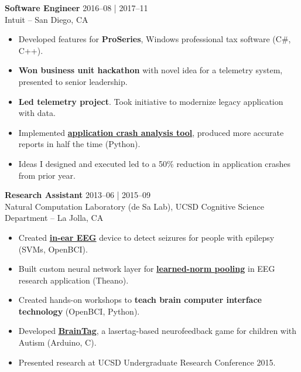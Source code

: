 \documentclass[line,mm]{res}
\begin{document}
{\bf Software Engineer} \hfill 2016--08 | 2017--11 \\
  Intuit -- San Diego, CA
  \begin{itemize}  \itemsep -2pt %
    \item Developed features for {\bf ProSeries}, Windows professional tax software (C\#, C++).
    \item {\bf Won business unit hackathon} with novel idea for a telemetry system, presented to senior leadership.
    \item {\bf Led telemetry project}. Took initiative to modernize legacy application with data.
    \item Implemented \href{https://github.com/alxrsngrtn/CrashAnalysisTool}{{\bf application crash analysis tool}}, produced more accurate reports in half the time (Python).
    \item Ideas I designed and executed led to a 50\% reduction in application crashes from prior year. 
  \end{itemize} 

	
{\bf Research Assistant} \hfill            2013--06 | 2015--09 \\
   Natural Computation Laboratory (de Sa Lab), UCSD Cognitive Science Department -- La Jolla, CA
   \begin{itemize}  \itemsep -2pt %
     \item Created \href{https://youtu.be/UMACp0fc9TA}{{\bf in-ear EEG}} device to detect seizures for people with epilepsy (SVMs, OpenBCI).
     \item Built custom neural network layer for \href{https://github.com/alxrsngrtn/LearnedNormPooling}{{\bf learned-norm pooling}} in EEG research application (Theano).
     \item Created hands-on workshops to {\bf teach brain computer interface technology} (OpenBCI, Python).
     \item Developed \href{https://github.com/alxrsngrtn/BrainTag}{{\bf BrainTag}}, a lasertag-based neurofeedback game for children with Autism (Arduino, C). 
     \item Presented research at UCSD Undergraduate Research Conference 2015.
   \end{itemize} 
	
    
\end{document}
